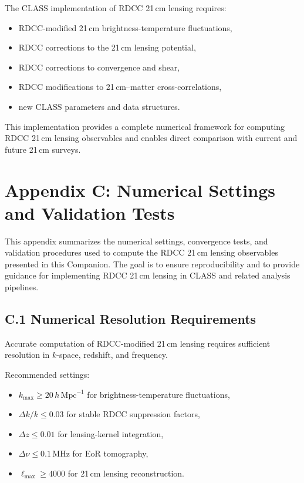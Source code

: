 \documentclass[11pt,a4paper]{article}
\begin{document}
The CLASS implementation of RDCC 21\,cm lensing requires:

\begin{itemize}
\item RDCC-modified 21\,cm brightness-temperature fluctuations,
\item RDCC corrections to the 21\,cm lensing potential,
\item RDCC corrections to convergence and shear,
\item RDCC modifications to 21\,cm–matter cross-correlations,
\item new CLASS parameters and data structures.
\end{itemize}

This implementation provides a complete numerical framework for computing RDCC 21\,cm
lensing observables and enables direct comparison with current and future 21\,cm surveys.

\section*{Appendix C: Numerical Settings and Validation Tests}

This appendix summarizes the numerical settings, convergence tests, and validation procedures
used to compute the RDCC 21\,cm lensing observables presented in this Companion. The goal is
to ensure reproducibility and to provide guidance for implementing RDCC 21\,cm lensing in
CLASS and related analysis pipelines.

\subsection*{C.1 Numerical Resolution Requirements}

Accurate computation of RDCC-modified 21\,cm lensing requires sufficient resolution in
$k$-space, redshift, and frequency.

Recommended settings:
\begin{itemize}
\item $k_{\mathrm{max}} \geq 20\,h\,\mathrm{Mpc}^{-1}$ for brightness-temperature fluctuations,
\item $\Delta k / k \leq 0.03$ for stable RDCC suppression factors,
\item $\Delta z \leq 0.01$ for lensing-kernel integration,
\item $\Delta \nu \leq 0.1\,\mathrm{MHz}$ for EoR tomography,
\item $\ell_{\mathrm{max}} \geq 4000$ for 21\,cm lensing reconstruction.
\end{itemize}
\end{document}
